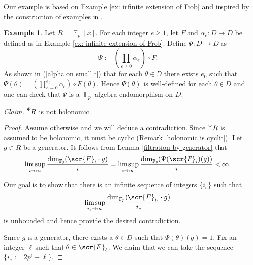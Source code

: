 \documentclass[11pt]{amsart}
\theoremstyle{definition}
\newtheorem{example}[theorem]{Example}
\theoremstyle{remark}
\numberwithin{equation}{subsection}
\DeclareMathOperator{\FF}{\mathbb{F}}
\begin{document}
Our example is based on Example \ref{ex: infinite extension of Frob} and inspired by the construction of examples in \cite{KLM12}. 
\begin{example}
\label{example not preserve holo}
Let $R=\FF_p[x]$. For each integer $e\geq 1$, let $\tilde{F}$ and $\alpha_e:D\to D$ be defined as in Example \ref{ex: infinite extension of Frob}. Define $\Phi:D\to D$ as 
\[\Psi:=(\prod_{e\geq 0}\alpha_e)\circ \tilde{F}.\]
As shown in (\ref{alpha on small t}) that for each $\theta\in D$ there exists $e_0$ such that $\Psi(\theta)=(\prod_{e=0}^{e_0}\alpha_e)\circ \tilde{F}(\theta)$. Hence $\Psi(\theta)$ is well-defined for each $\theta\in D$ and one can check that $\Psi$ is a $\FF_p$-algebra endomorphism on $D$.

{\it Claim.} $\prescript{\Psi}{}R$ is not holonomic.

\begin{proof}
Assume otherwise and we will deduce a contradiction. Since $\prescript{\Psi}{}R$ is assumed to be holonomic, it must be cyclic (Remark \ref{holonomic is cyclic}). Let $g\in R$ be a generator. It follows from Lemma \ref{filtration by generator} that
\[\limsup_{i\to \infty}\frac{\dim_{\FF_p}(\scr{F}_i\cdot g)}{i}=\limsup_{i\to \infty}\frac{\dim_{\FF_p}(\Psi(\scr{F}_i)(g))}{i}<\infty.\]

Our goal is to show that there is an infinite sequence of integers $\{i_e\}$ such that 
\[\limsup_{i_e\to \infty}\frac{\dim_{\FF_p}(\scr{F}_{i_e}\cdot g)}{i_e}\]
is unbounded and hence provide the desired contradiction.

Since $g$ is a generator, there exists a $\theta\in D$ such that $\Psi(\theta)(g)=1$. Fix an integer $\ell$ such that $\theta\in \scr{F}_{\ell}$. We claim that we can take the sequence $\{i_e:=2p^e+\ell\}$.


\end{proof}
\end{example}
\end{document}
